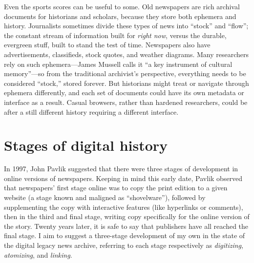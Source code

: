 Even the sports scores can be useful to some. Old newspapers are rich archival documents for historians and scholars, because they store both ephemera and history. Journalists sometimes divide these types of news into ``stock'' and ``flow''; the constant stream of information built for \emph{right now}, versus the durable, evergreen stuff, built to stand the test of time.\autocite{sloan_stock_2010} Newspapers also have advertisements, classifieds, stock quotes, and weather diagrams. Many researchers rely on such ephemera---James Mussell calls it ``a key instrument of cultural memory''---so from the traditional archivist's perspective, everything needs to be considered ``stock,'' stored forever.\autocite{mussell_passing_2012} But historians might treat or navigate through ephemera differently, and each set of documents could have its own metadata or interface as a result. Casual browsers, rather than hardened researchers, could be after a still different history requiring a different interface.






\section{Stages of digital history}


In 1997, John Pavlik suggested that there were three stages of development in online versions of newspapers. Keeping in mind this early date, Pavlik observed that newspapers' first stage online was to copy the print edition to a given website (a stage known and maligned as ``shovelware''), followed by supplementing the copy with interactive features (like hyperlinks or comments), then in the third and final stage, writing copy specifically for the online version of the story.\autocite{pavlik_future_1997} Twenty years later, it is safe to say that publishers have all reached the final stage. I aim to suggest a three-stage development of my own in the state of the digital legacy news archive, referring to each stage respectively as \emph{digitizing}, \emph{atomizing}, and \emph{linking}.

